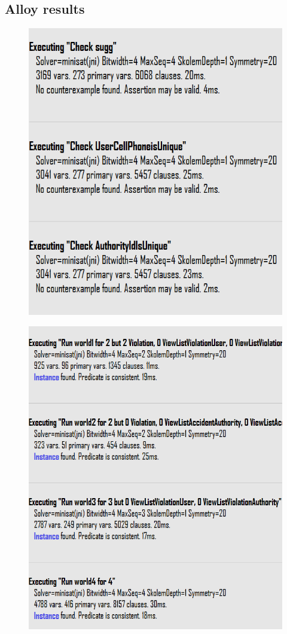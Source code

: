 \subsection{\LARGE {Alloy results}}
\begin{figure}[h]
\includegraphics[scale=1.1]{Images/AlloyWorlds/ExecutingChecks.PNG}
\end{figure}
\begin{figure}[H]
\includegraphics[scale=1]{Images/AlloyWorlds/ExecutingPredicates.PNG}
\end{figure}